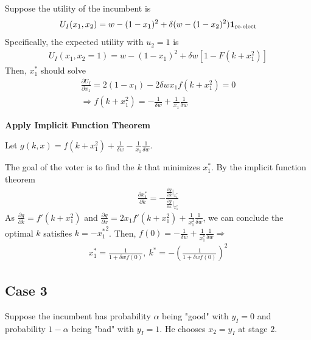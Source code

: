 \documentclass[11pt]{elegantbook}
\begin{document}
Suppose the utility of the incumbent is $$U_I(x_1,x_2)=w-(1-x_1)^2+\delta (w-(1-x_2)^2) \mathbf{1}_\textnormal{re-elect}$$
Specifically, the expected utility with $u_2=1$ is
\begin{equation}
    \begin{aligned}
        U_I(x_1,x_2=1)=w-(1-x_1)^2+\delta w \left[1-F(k+x_1^2)\right]
    \end{aligned}
    \nonumber
\end{equation}
Then, $x_1^*$ should solve
\begin{equation}
    \begin{aligned}
        \frac{\partial U_I}{\partial x_1}=2(1-x_1)-2\delta w x_1 f(k+x_1^2)=0\\
        \Rightarrow f(k+x_1^2)=-\frac{1}{\delta w}+\frac{1}{x_1}\frac{1}{\delta w}
    \end{aligned}
    \nonumber
\end{equation}

\textbf{Apply Implicit Function Theorem}

Let $g(k,x)=f(k+x_1^2)+\frac{1}{\delta w}-\frac{1}{x_1}\frac{1}{\delta w}$.

The goal of the voter is to find the $k$ that minimizes $x_1^*$. By the implicit function theorem
\begin{equation}
    \begin{aligned}
        \frac{\partial x_1^*}{\partial k}=-\frac{\frac{\partial g}{\partial k}\big|_{x_1^*}}{\frac{\partial g}{\partial x}\big|_{x_1^*}}
    \end{aligned}
    \nonumber
\end{equation}
As $\frac{\partial g}{\partial k}=f'(k+x_1^2)$ and $\frac{\partial g}{\partial x}=2x_1 f'(k+x_1^2)+\frac{1}{x_1^2}\frac{1}{\delta w}$, we can conclude the optimal $k$ satisfies $k=-{x_1^*}^2$. Then, $f(0)=-\frac{1}{\delta w}+\frac{1}{x_1^*}\frac{1}{\delta w} \Rightarrow $
\begin{equation}
    \begin{aligned}
        x_1^*=\frac{1}{1+\delta w f(0)},\ k^*=-\left(\frac{1}{1+\delta w f(0)}\right)^2
    \end{aligned}
    \nonumber
\end{equation}

\subsection{Case 3}
Suppose the incumbent has probability $\alpha$ being "good" with $y_I=0$ and probability $1-\alpha$ being "bad" with $y_I=1$. He chooses $x_2=y_I$ at stage $2$.
\end{document}
